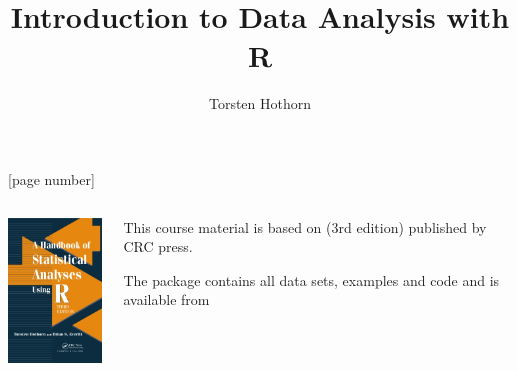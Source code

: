 \documentclass{beamer}
\title{Introduction to Data Analysis with \textsf{R}}
\author[T. Hothorn]{Torsten Hothorn}
\institute{
  Universit\"at Z\"urich \\
  \texttt{Torsten.Hothorn@R-project.org}
}
\date{}
\begin{document}
\frame{\titlepage}

[page number]

\begin{frame}[fragile]

    \begin{columns}

       \begin{column}{3.5cm}
           \includegraphics[width = 3cm]{graphics/HSAUR}
       \end{column}

       \begin{column}{7.5cm}

           This course material is based on 
           (3rd edition) published by CRC press. 

           The \R{} package  contains all data sets, 
           examples and \R{} code and is available from 
       \end{column}
    \end{columns}

\end{frame}
\end{document}
